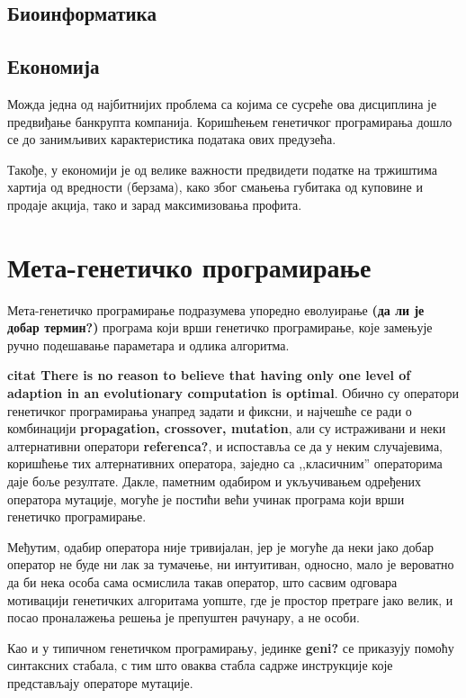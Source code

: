 \documentclass[a4paper]{article}
\begin{document}
\subsection{Биоинформатика}
\subsection{Економија}
Можда једна од најбитнијих проблема са којима се сусреће ова дисциплина је предвиђање банкрупта компанија. Коришћењем генетичког програмирања дошло се до занимљивих карактеристика података ових предузећа. \cite{bankruptcy}

Такође, у економији је од велике важности предвидети податке на тржиштима хартија од вредности (берзама), како због смањења губитака од куповине и продаје акција, тако и зарад максимизовања профита. \cite{stock}

\section{Мета-генетичко програмирање}

Мета-генетичко програмирање подразумева упоредно еволуирање \textbf{(да ли је добар термин?)} програма који врши генетичко програмирање, које замењује ручно подешавање параметара и одлика алгоритма. 
\linebreak

\textbf{citat There is no reason to believe that having only one level of adaption in an evolutionary computation is optimal}. Обично су оператори генетичког програмирања унапред задати и фиксни, и најчешће се ради о комбинацији \textbf{propagation, crossover, mutation}, али су истраживани и неки алтернативни оператори \textbf{referenca?}, и испоставља се да у неким случајевима, коришћење тих алтернативних оператора, заједно са ,,класичним'' операторима даје боље резултате. Дакле, паметним одабиром и укључивањем одређених оператора мутације, могуће је постићи већи учинак програма који врши генетичко програмирање.
\linebreak

Међутим, одабир оператора није тривијалан, јер је могуће да неки јако добар оператор не буде ни лак за тумачење, ни интуитиван, односно, мало је вероватно да би нека особа сама осмислила такав оператор, што сасвим одговара мотивацији генетичких алгоритама уопште, где је простор претраге јако велик, и посао проналажења решења је препуштен рачунару, а не особи.
\linebreak

Као и у типичном генетичком програмирању, јединке \textbf{geni?} се приказују помоћу синтаксних стабала, с тим што оваква стабла садрже инструкције које представљају операторе мутације.
\linebreak
\end{document}
